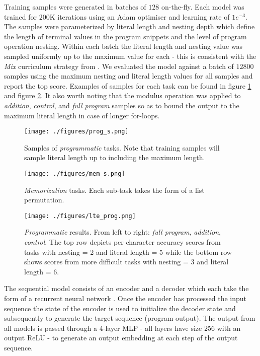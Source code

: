 \documentclass{article}
\begin{document}
Training samples were generated in batches of $128$ on-the-fly. Each model was trained for $200$K iterations using an Adam optimiser and learning rate of $1e^{-3}$. The samples were parameterized by literal length and nesting depth which define the length of terminal values in the program snippets and the level of program operation nesting. Within each batch the literal length and nesting value was sampled uniformly up to the maximum value for each - this is consistent with the \textit{Mix} curriculum strategy from \cite{zaremba2014lte}. We evaluated the model against a batch of $12800$ samples using the maximum nesting and literal length values for all samples and report the top score.  Examples of samples for each task can be found in figure \ref{fig:psamp} and figure \ref{fig:msamp}.  It also worth noting that the modulus operation was applied to \textit{addition}, \textit{control}, and \textit{full program} samples so as to bound the output to the maximum literal length in case of longer for-loops.

\begin{figure}
    \centering
    \texttt{[image: ./figures/prog\_s.png]}
    \caption{Samples of \textit{programmatic} tasks.  Note that training samples will sample literal length up to including the maximum length. }
    \label{fig:psamp}
\end{figure}

\begin{figure}
    \centering
    \texttt{[image: ./figures/mem\_s.png]}
    \caption{\textit{Memorization} tasks.  Each sub-task takes the form of a list permutation. }
    \label{fig:msamp}
\end{figure}

\begin{figure}
    \centering
    \texttt{[image: ./figures/lte\_prog.png]}
    \caption{\textit{Programmatic} results.  From left to right: \textit{full program}, \textit{addition}, \textit{control}. The top row depicts per character accuracy scores from tasks with nesting = 2 and literal length = 5 while the bottom row shows scores from more difficult tasks with nesting = 3 and literal length = 6.}
    \label{fig:lte_results_prog}
\end{figure}


The sequential model consists of an encoder and a decoder which each take the form of a recurrent neural network \cite{sutskever2014seq2seq, zaremba2014lte}.  Once the encoder has processed the input sequence the state of the encoder is used to initialize the decoder state and subsequently to generate the target sequence (program output).  The output from all models is passed through a 4-layer MLP - all layers have size $256$ with an output ReLU - to generate an output embedding at each step of the output sequence.
\end{document}
